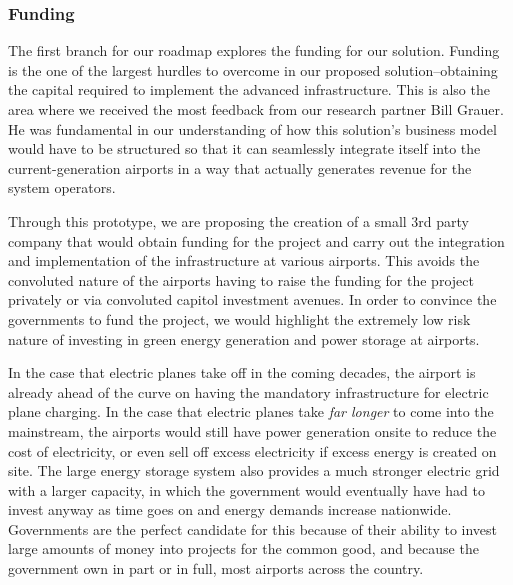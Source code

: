 \documentclass[../main.tex]{subfiles}
\begin{document}
\subsubsection{Funding}
The first branch for our roadmap explores the funding for our solution. Funding is the one of the largest hurdles to overcome in our proposed solution--obtaining the capital required to implement the advanced infrastructure. This is also the area where we received the most feedback from our research partner Bill Grauer. He was fundamental in our understanding of how this solution's business model would have to be structured so that it can seamlessly integrate itself into the current-generation airports in a way that actually generates revenue for the system operators.\par 
Through this prototype, we are proposing the creation of a small 3rd party company that would obtain funding for the project and carry out the integration and implementation of the infrastructure at various airports. This avoids the convoluted nature of the airports having to raise the funding for the project privately or via convoluted capitol investment avenues. In order to convince the governments to fund the project, we would highlight the extremely low risk nature of investing in green energy generation and power storage at airports.\par
In the case that electric planes take off in the coming decades, the airport is already ahead of the curve on having the mandatory infrastructure for electric plane charging. In the case that electric planes take \emph{far longer} to come into the mainstream, the airports would still have power generation onsite to reduce the cost of electricity, or even sell off excess electricity if excess energy is created on site. The large energy storage system also provides a much stronger electric grid with a larger capacity, in which the government would eventually have had to invest anyway as time goes on and energy demands increase nationwide. Governments are the perfect candidate for this because of their ability to invest large amounts of money into projects for the common good, and because the government own in part or in full, most airports across the country.\par  
\newpage
\end{document}
